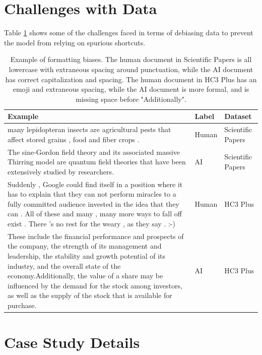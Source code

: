 \documentclass[11pt]{article}
\begin{document}
\section{Challenges with Data}
Table \ref{table:dataset_bias} shows some of the challenges faced in terms of debiasing data to prevent the model from relying on spurious shortcuts.
\label{sec:}
\begin{table}[h!]
    \centering
    \begin{tabular}{p{} p{} p{}}
        \toprule
         Example & Label & Dataset \\
        \midrule
        many lepidopteran insects are agricultural pests that affect stored grains , food and fiber crops . & Human & Scientific Papers \\
        \midrule
        The sine-Gordon field theory and its associated massive Thirring model are quantum field theories that have been extensively studied by researchers.  & AI & Scientific Papers \\
        \midrule
        Suddenly , Google could find itself in a position where it has to explain that they can not perform miracles to a fully committed audience invested in the idea that they can . All of these and many , many more ways to fall off exist . There 's no rest for the weary , as they say . :-) & Human & HC3 Plus \\
        \midrule
        These include the financial performance and prospects of the company, the strength of its management and leadership, the stability and growth potential of its industry, and the overall state of the economy.Additionally, the value of a share may be influenced by the demand for the stock among investors, as well as the supply of the stock that is available for purchase. & AI & HC3 Plus \\
        \bottomrule
    \end{tabular}
    \caption{Example of formatting biases. The human document in Scientific Papers is all lowercase with extraneous spacing around punctuation, while the AI document has correct capitalization and spacing. The human document in HC3 Plus has an emoji and extraneous spacing, while the AI document is more formal, and is missing space before "Additionally". }
    \label{table:dataset_bias}
\end{table}


\section{Case Study Details}
\end{document}
